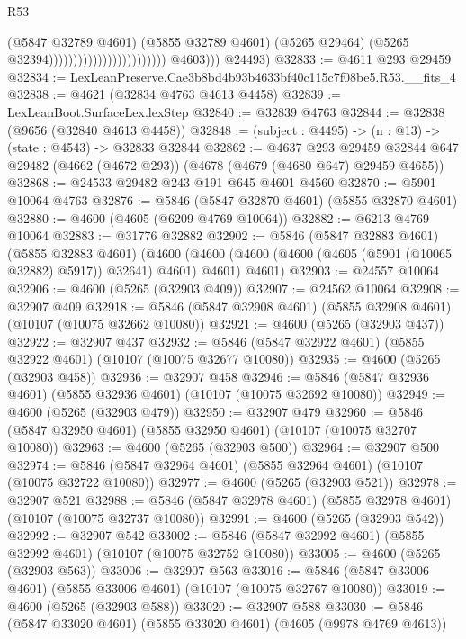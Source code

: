 \begin{lexlean}{R53}
\begin{coremodule}
                                                          (@5847 @32789 @4601)
                                                          (@5855 @32789 @4601)
                                                          (@5265 @29464)
                                                          (@5265 @32394))))))))))))))))))))))))
            @4603)))
      @24493)
@32833 := @4611 @293 @29459
@32834 := LexLeanPreserve.Cae3b8bd4b93b4633bf40c115c7f08be5.R53.__fits_4
@32838 := @4621 (@32834 @4763 @4613 @4458)
@32839 := LexLeanBoot.SurfaceLex.lexStep
@32840 := @32839 @4763
@32844 := @32838 (@9656 (@32840 @4613 @4458))
@32848 := (subject : @4495) -> (n : @13) -> (state : @4543) -> @32833 @32844
@32862 := @4637
    @293
    @29459
    @32844
    @647
    @29482
    (@4662 (@4672 @293))
    (@4678 (@4679 (@4680 @647) @29459 @4655))
@32868 := @24533 @29482 @243 @191 @645 @4601 @4560
@32870 := @5901 @10064 @4763
@32876 := @5846 (@5847 @32870 @4601) (@5855 @32870 @4601)
@32880 := @4600 (@4605 (@6209 @4769 @10064))
@32882 := @6213 @4769 @10064
@32883 := @31776 @32882
@32902 := @5846
    (@5847 @32883 @4601)
    (@5855 @32883 @4601)
    (@4600 (@4600 (@4600 (@4600 (@4605 (@5901 (@10065 @32882) @5917)) @32641) @4601) @4601) @4601)
@32903 := @24557 @10064
@32906 := @4600 (@5265 (@32903 @409))
@32907 := @24562 @10064
@32908 := @32907 @409
@32918 := @5846 (@5847 @32908 @4601) (@5855 @32908 @4601) (@10107 (@10075 @32662 @10080))
@32921 := @4600 (@5265 (@32903 @437))
@32922 := @32907 @437
@32932 := @5846 (@5847 @32922 @4601) (@5855 @32922 @4601) (@10107 (@10075 @32677 @10080))
@32935 := @4600 (@5265 (@32903 @458))
@32936 := @32907 @458
@32946 := @5846 (@5847 @32936 @4601) (@5855 @32936 @4601) (@10107 (@10075 @32692 @10080))
@32949 := @4600 (@5265 (@32903 @479))
@32950 := @32907 @479
@32960 := @5846 (@5847 @32950 @4601) (@5855 @32950 @4601) (@10107 (@10075 @32707 @10080))
@32963 := @4600 (@5265 (@32903 @500))
@32964 := @32907 @500
@32974 := @5846 (@5847 @32964 @4601) (@5855 @32964 @4601) (@10107 (@10075 @32722 @10080))
@32977 := @4600 (@5265 (@32903 @521))
@32978 := @32907 @521
@32988 := @5846 (@5847 @32978 @4601) (@5855 @32978 @4601) (@10107 (@10075 @32737 @10080))
@32991 := @4600 (@5265 (@32903 @542))
@32992 := @32907 @542
@33002 := @5846 (@5847 @32992 @4601) (@5855 @32992 @4601) (@10107 (@10075 @32752 @10080))
@33005 := @4600 (@5265 (@32903 @563))
@33006 := @32907 @563
@33016 := @5846 (@5847 @33006 @4601) (@5855 @33006 @4601) (@10107 (@10075 @32767 @10080))
@33019 := @4600 (@5265 (@32903 @588))
@33020 := @32907 @588
@33030 := @5846 (@5847 @33020 @4601) (@5855 @33020 @4601) (@4605 (@9978 @4769 @4613))

\end{coremodule}
\end{lexlean}
